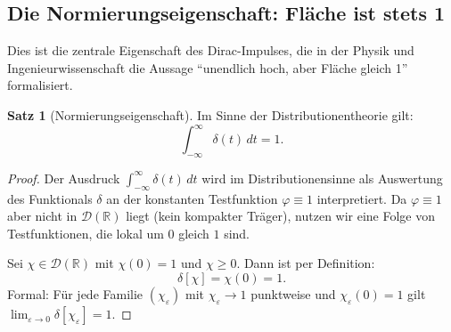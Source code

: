 ﻿\documentclass[a4paper,12pt]{article}
\theoremstyle{definition}
\newtheorem{satz}{Satz}
\begin{document}
\subsection{Die Normierungseigenschaft: Fl\"ache ist stets 1}

Dies ist die zentrale Eigenschaft des Dirac-Impulses, die in der Physik und Ingenieurwissenschaft
die Aussage ``unendlich hoch, aber Fl\"ache gleich 1'' formalisiert.

\begin{satz}[Normierungseigenschaft]
\label{satz:normierung}
Im Sinne der Distributionentheorie gilt:
\[
\int_{-\infty}^{\infty} \delta(t)\,dt = 1.
\]
\end{satz}

\begin{proof}
Der Ausdruck $\int_{-\infty}^{\infty} \delta(t)\,dt$ wird im Distributionensinne als Auswertung
des Funktionals $\delta$ an der konstanten Testfunktion $\varphi \equiv 1$ interpretiert.
Da $\varphi \equiv 1$ aber nicht in $\mathcal{D}(\mathbb{R})$ liegt (kein kompakter Tr\"ager),
nutzen wir eine Folge von Testfunktionen, die lokal um $0$ gleich $1$ sind.

Sei $\chi \in \mathcal{D}(\mathbb{R})$ mit $\chi(0) = 1$ und $\chi \geq 0$.
Dann ist per Definition:
\[
\delta[\chi] = \chi(0) = 1.
\]
Formal: F\"ur jede Familie $(\chi_\varepsilon)$ mit $\chi_\varepsilon \to 1$ punktweise
und $\chi_\varepsilon(0) = 1$ gilt $\lim_{\varepsilon \to 0} \delta[\chi_\varepsilon] = 1$.


\end{proof}
\end{document}
